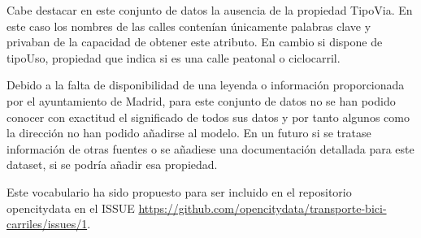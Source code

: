 Cabe destacar en este conjunto de datos la ausencia de la propiedad TipoVia. En este caso los nombres de las calles contenían únicamente palabras clave y privaban de la capacidad de obtener este atributo. En cambio si dispone de tipoUso, propiedad que indica si es una calle peatonal o ciclocarril.


Debido a la falta de disponibilidad de una leyenda o información proporcionada por el ayuntamiento de Madrid, para este conjunto de datos no se han podido conocer con exactitud el significado de todos sus datos y por tanto algunos como la dirección no han podido añadirse al modelo. En un futuro si se tratase información de otras fuentes o se añadiese una documentación detallada para este dataset, si se podría añadir esa propiedad.

Este vocabulario ha sido propuesto para ser incluido en el repositorio opencitydata en el ISSUE \url{https://github.com/opencitydata/transporte-bici-carriles/issues/1}.





